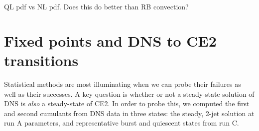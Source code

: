 \documentclass{jfm}
\newcommand{\cmark}{\ding{51}}%
\newcommand{\done}{\rlap{$\square$}{\raisebox{2pt}{\large\hspace{1pt}\cmark}}%
\hspace{-2.5pt}}
\begin{document}
QL pdf vs NL pdf.
Does this do better than RB convection?



\section{Fixed points and DNS to CE2 transitions}
\label{sec:fixed}
Statistical methods are most illuminating when we can probe their failures as well as their successes.
A key question is whether or not a steady-state solution of DNS is \emph{also} a steady-state of CE2.
In order to probe this, we computed the first and second cumulants from DNS data in three states: the steady, 2-jet solution at run A parameters, and representative burst and quiescent states from run C.
\end{document}
